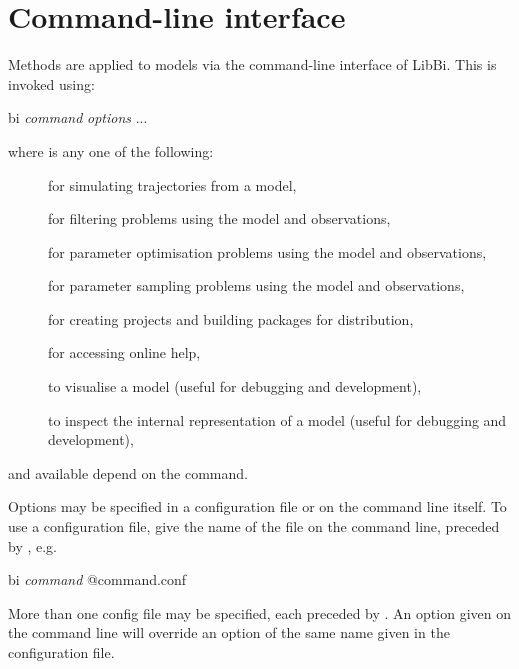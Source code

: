 \section{Command-line interface\label{Command_line_interface}}

Methods are applied to models via the command-line interface of LibBi. This is
invoked using:
\begin{cmdcode}
bi \textit{command} \textit{options} ...
\end{cmdcode}
where  is any one of the following:
\begin{description}
\item[] for simulating trajectories from a model,
\item[] for filtering problems using the model and
  observations,
\item[] for parameter optimisation problems using the
  model and observations,
\item[] for parameter sampling problems using the model and
  observations,
\item[] for creating projects and building packages for
  distribution,
\item[] for accessing online help,
\item[] to visualise a model (useful for
  debugging and development),
\item[] to inspect the internal representation of a model
  (useful for debugging and development),
\end{description}
and available  depend on the command.

Options may be specified in a configuration file or on the
command line itself. To use a configuration file, give the name of the file on
the command line, preceded by , e.g.
\begin{cmdcode}
bi \textit{command} @command.conf
\end{cmdcode}

More than one config file may be specified, each preceded by . An
option given on the command line will override an option of the same name
given in the configuration file.

